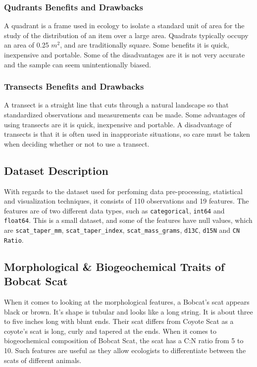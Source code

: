 \documentclass[a4paper]{article}
\begin{document}
\subsubsection{Qudrants Benefits and Drawbacks}
A quadrant is a frame used in ecology to isolate a standard unit of area for the study of the distribution of an item over a large area. Quadrats typically 
occupy an area of 0.25 $m^2$, and are traditionally square. Some benefits it is quick, inexpensive and portable. Some of the disadvantages are it is not 
very accurate and the sample can seem unintentionally biased.

\subsubsection{Transects Benefits and Drawbacks}
A transect is a straight line that cuts through a natural landscape so that standardized observations and measurements can be made. Some advantages of using
transects are it is quick, inexpensive and portable. A disadvantage of transects is that it is often used in inapproriate situations, so care must be taken 
when deciding whether or not to use a transect.

\subsection{Dataset Description}
With regards to the dataset used for perfoming data pre-processing, statistical and visualization techniques, it consists of 110 observations and 19 features.
The features are of two different data types, such as \texttt{categorical}, \texttt{int64} and \texttt{float64}. This is a small dataset, and some of the 
features have null values, which are \texttt{scat\_taper\_mm}, \texttt{scat\_taper\_index}, \texttt{scat\_mass\_grams}, \texttt{d13C}, \texttt{d15N} and 
\texttt{CN Ratio}.

\subsection{Morphological \& Biogeochemical Traits of Bobcat Scat}
When it comes to looking at the morphological features, a Bobcat's scat appears black or brown. It's shape is tubular and looks like a long string. It is
about three to five inches long with blunt ends. Their scat differs from Coyote Scat as a coyote's scat is long, curly and tapered at the ends. When it comes
to biogeochemical composition of Bobcat Scat, the scat has a C:N ratio from 5 to 10. Such features are useful as they allow ecologists to differentiate between
the scats of different animals.
\end{document}
